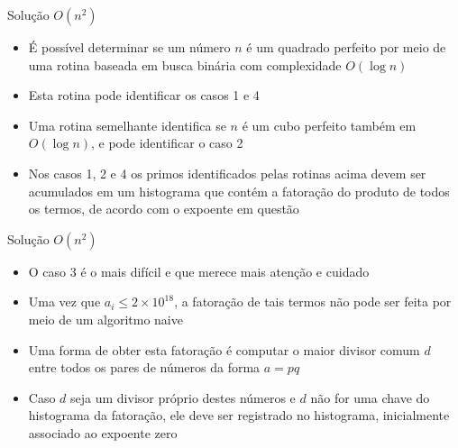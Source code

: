 \begin{frame}[fragile]{Solução $O(n^2)$}

    \begin{itemize}
        \item É possível determinar se um número $n$ é um quadrado perfeito por meio de uma
            rotina baseada em busca binária com complexidade $O(\log n)$

        \item Esta rotina pode identificar os casos 1 e 4

        \item Uma rotina semelhante identifica se $n$ é um cubo perfeito também em $O(\log n)$, e
            pode identificar o caso 2

        \item Nos casos 1, 2 e 4 os primos identificados pelas rotinas acima devem ser acumulados
            em um histograma que contém a fatoração do produto de todos os termos, de acordo com
            o expoente em questão
        
    \end{itemize}

\end{frame}

\begin{frame}[fragile]{Solução $O(n^2)$}

    \begin{itemize}
        \item O caso 3 é o mais difícil e que merece mais atenção e cuidado

        \item Uma vez que $a_i \leq 2\times 10^{18}$, a fatoração de tais termos não pode ser
            feita por meio de um algoritmo naive

        \item Uma forma de obter esta fatoração é computar o maior divisor comum $d$ entre todos os
            pares de números da forma $a = pq$

        \item Caso $d$ seja um divisor próprio destes números e $d$ não for uma chave do 
            histograma da fatoração, ele deve ser registrado no histograma, inicialmente 
            associado ao expoente zero
    \end{itemize}

\end{frame}

